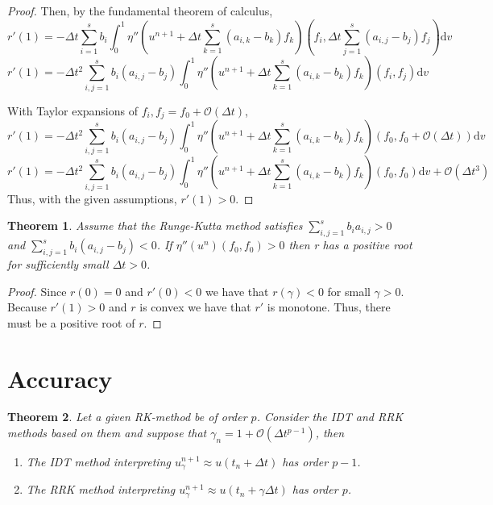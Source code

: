\documentclass{report}
\newtheorem{theorem}{Theorem}[section]
\begin{document}
\begin{proof}
        Then, by the fundamental theorem of calculus,
        \begin{equation*}
            r'(1) = -\Delta t \sum_{i=1}^{s}b_i \int_{0}^{1} \eta'' \left(u^{n+1} + \Delta t \sum_{k=1}^s \left(a_{i,k}-b_k\right)f_k\right)\left(f_i,\Delta t \sum_{j=1}^s \left(a_{i,j}-b_j\right)f_j\right) \text{d}v
        \end{equation*}
        \begin{equation*}
            r'(1) = -\Delta t^2 \sum_{i,j=1}^{s}b_i\left(a_{i,j}-b_j\right) \int_{0}^{1} \eta'' \left(u^{n+1} + \Delta t \sum_{k=1}^s \left(a_{i,k}-b_k\right)f_k\right)\left(f_i,f_j\right) \text{d}v
        \end{equation*}

        With Taylor expansions of \(f_i, f_j = f_0 + \mathcal{O}(\Delta t)\),
        \begin{equation*}
            r'(1) = -\Delta t^2 \sum_{i,j=1}^{s}b_i\left(a_{i,j}-b_j\right) \int_{0}^{1} \eta'' \left(u^{n+1} + \Delta t \sum_{k=1}^s \left(a_{i,k}-b_k\right)f_k\right) \left(f_0,f_0+\mathcal{O}(\Delta t)\right) \text{d}v
        \end{equation*}
        \begin{equation*}
            r'(1) = -\Delta t^2 \sum_{i,j=1}^{s}b_i\left(a_{i,j}-b_j\right) \int_{0}^{1} \eta'' \left(u^{n+1} + \Delta t \sum_{k=1}^s \left(a_{i,k}-b_k\right)f_k\right) \left(f_0,f_0\right) \text{d}v+\mathcal{O}(\Delta t^3)
        \end{equation*}
        Thus, with the given assumptions, \(r'(1)>0\).
    \end{proof}

    \begin{theorem}
        Assume that the Runge-Kutta method satisfies \(\sum_{i,j=1}^{s} b_ia_{i,j}> 0\) and \(\sum_{i,j=1}^{s} b_i(a_{i,j}-b_j) < 0\). If \(\eta''(u^n)(f_0,f_0) > 0\) then r has a positive root for sufficiently small \(\Delta t > 0\).
    \end{theorem}
    \begin{proof}
        Since \(r(0)=0\) and \(r'(0) < 0\) we have that \(r(\gamma)<0\) for small \(\gamma > 0\). Because \(r'(1)>0\) and \(r\) is convex we have that \(r'\) is monotone. Thus, there must be a positive root of \(r\).
    \end{proof}


\section{Accuracy}
    \begin{theorem}
        Let a given RK-method be of order \(p\). Consider the IDT and RRK methods based on them and suppose that \(\gamma_n = 1 + \mathcal{O}(\Delta t^{p-1})\), then
        \begin{enumerate}
            \item The IDT method interpreting \(u_{\gamma}^{n+1} \approx u(t_n + \Delta t)\) has order \(p-1\).
            \item The RRK method interpreting \(u_{\gamma}^{n+1} \approx u(t_n + \gamma \Delta t)\) has order \(p\).
        \end{enumerate}
    \end{theorem}
\end{document}
